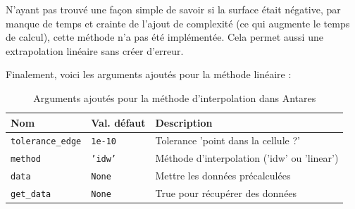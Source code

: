 N'ayant pas trouvé une façon simple de savoir si la surface était négative, par manque de temps et crainte de l'ajout de complexité (ce qui augmente le temps de calcul), cette méthode n'a pas été implémentée.
Cela permet aussi une extrapolation linéaire sans créer d'erreur.


Finalement, voici les arguments ajoutés pour la méthode linéaire :

\label{arguments_ajoutes}
\begin{table}[H]
    \centering
    \begin{tabular}{|l|l|l|}
    \hline
    \textbf{Nom} & \textbf{Val. défaut} & \textbf{Description} \\ \hline %

    \texttt{tolerance\_edge} & \texttt{1e-10} & Tolerance 'point dans la cellule ?' \\
    \texttt{method} & \texttt{'idw'} & Méthode d'interpolation ('idw' ou 'linear') \\
    \texttt{data} & \texttt{None} & Mettre les données précalculées \\
    \texttt{get\_data} & \texttt{None} & True pour récupérer des données \\ \hline
    \end{tabular}
    \caption{Arguments ajoutés pour la méthode d'interpolation dans Antares}
    \label{tab:arguments_interpolation2}
\end{table}

